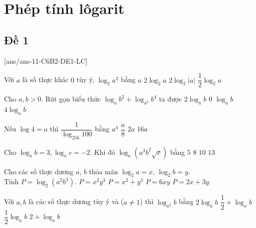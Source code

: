 \section{Phép tính lôgarit}

\subsection{Đề 1}
[ans/ans-11-C6B2-DE1-LC]
\caulc
\begin{ex}%
	Với $ a$ là số thực khác $0$ tùy ý, $\log_2a^2$ bằng
	\choice
	{$a$}
	{$2\log_2a$}
	{\True $2\log_2|a|$}
	{$\dfrac{1}{2}\log_2a$}
\end{ex}
\begin{ex}%
	Cho $ a,b > 0$. Rút gọn biểu thức $\log_a{b^2}+\log_{a^2}{b^4}$ ta được
	\choice
	{$ 2\log_ab$}
	{$ 0$}
	{$\log_ab$}
	{\True $ 4\log_ab$}
\end{ex}
\begin{ex}%
	Nếu $\log 4=a$ thì $\dfrac{1}{\log_{256}100}$ bằng
	\choice
	{$a^4$}
	{$\dfrac{a}{8}$}
	{\True $ 2a$}
	{$ 16a$}
\end{ex}
\begin{ex}%
	Cho $\log_ab=3,\log_ac=-2$. Khi đó $\log_a\left(a^3b^2\sqrt c\right)$ bằng
	\choice
	{$ 5$}
	{\True $ 8$}
	{$ 10$}
	{$ 13$}
\end{ex}
\begin{ex}%
	Cho các số thực dương $ a$, $ b$ thỏa mãn $\log_2a=x$, $\log_2b=y$.\\ Tính $ P=\log_2\left(a^2b^3\right)$.
	\choice
	{$ P=x^2y^3$}
	{$ P=x^2+y^3$}
	{$ P=6xy$}
	{\True $ P=2x+3y$}
\end{ex}
\begin{ex}%
	Với $ a,b$ là các số thực dương tùy ý và ($ a\ne 1$) thì $\log_{a^2}b$ bằng
	\choice
	{$ 2\log_ab$}
	{$\dfrac{1}{2}+\log_ab$}
	{\True $\dfrac{1}{2}{\log_a}b$}
	{$ 2+\log_ab$}
\end{ex}
